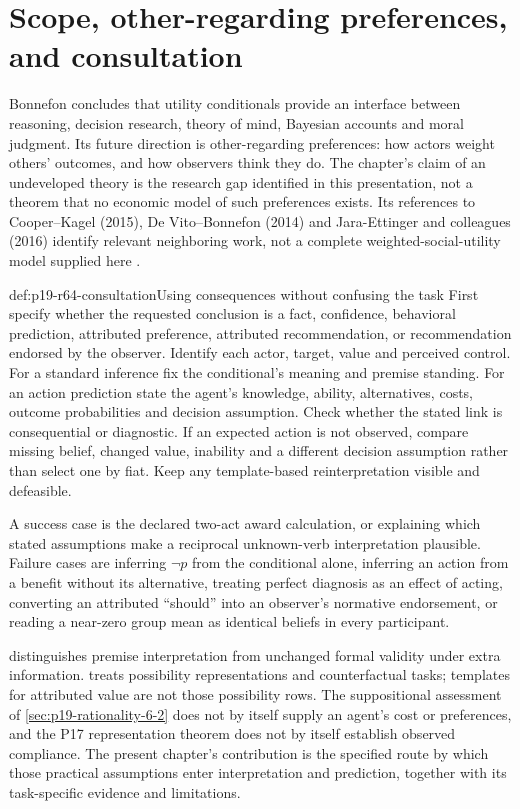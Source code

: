 \section{Scope, other-regarding preferences, and consultation}
\label{sec:p19-r64-consultation}

Bonnefon concludes that utility conditionals provide an interface between
reasoning, decision research, theory of mind, Bayesian accounts and moral
judgment. Its future direction is other-regarding preferences: how actors
weight others' outcomes, and how observers think they do. The chapter's
claim of an undeveloped theory is the research gap identified in this
presentation, not a theorem that no economic model of such preferences
exists. Its references to Cooper--Kagel (2015), De Vito--Bonnefon (2014)
and Jara-Ettinger and colleagues (2016) identify relevant neighboring work,
not a complete weighted-social-utility model supplied here
\cite[p.~422]{Bonnefon2021Utility}.

\begin{hbmethod}{def:p19-r64-consultation}{Using consequences without confusing the task}
First specify whether the requested conclusion is a fact, confidence,
behavioral prediction, attributed preference, attributed recommendation,
or recommendation endorsed by the observer. Identify each actor, target,
value and perceived control. For a standard inference fix the conditional's
meaning and premise standing. For an action prediction state the agent's
knowledge, ability, alternatives, costs, outcome probabilities and decision
assumption. Check whether the stated link is consequential or diagnostic.
If an expected action is not observed, compare missing belief, changed value,
inability and a different decision assumption rather than select one by fiat.
Keep any template-based reinterpretation visible and defeasible.
\end{hbmethod}

A success case is the declared two-act award calculation, or explaining
which stated assumptions make a reciprocal unknown-verb interpretation
plausible. Failure cases are inferring \(\neg p\) from the conditional
alone, inferring an action from a benefit without its alternative, treating
perfect diagnosis as an effect of acting, converting an attributed ``should''
into an observer's normative endorsement, or reading a near-zero group
mean as identical beliefs in every participant.

 distinguishes premise
interpretation from unchanged formal validity under extra information.
 treats possibility representations and
counterfactual tasks; templates for attributed value are not those possibility
rows. The suppositional assessment of \cref{sec:p19-rationality-6-2}
does not by itself supply an agent's cost or preferences, and the P17
representation theorem does not by itself establish observed compliance.
The present chapter's contribution is the specified route by which those
practical assumptions enter interpretation and prediction, together with
its task-specific evidence and limitations.
